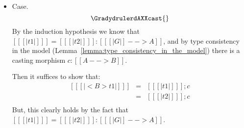 \begin{itemize}
\item[] Case.
  \[
  \GradydrulerdAXXcast{} 
  \]
  By the induction hypothesis we know that
  $[[ [| t1 |] ]] = [[ [| t2 |] ]] : [[ [| G |] --> A]]$, and by
  type consistency in the model
  (Lemma~\ref{lemma:type_consistency_in_the_model}) there is a
  casting morphism $c : [[A --> B]]$.

  Then it suffices to show that:
  \[
  \begin{array}{lll}
    [[ [| <B>t1 |] ]]
    & = & [[ [| t1 |] ]];c\\
    & = & [[ [| t2 |] ]];c\\
    [[ [| <B>t2 |] ]]
  \end{array}
  \]
  But, this clearly holds by the fact that $[[ [| t1 |] ]] = [[ [| t2 |] ]] : [[ [| G |] --> A]]$.
\end{itemize}

